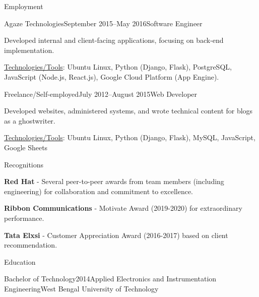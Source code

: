 \documentclass{resume} %
\begin{document}
\begin{rSection}{Employment}

\begin{rSubsection}{Agaze Technologies}{September 2015–May 2016}{Software Engineer}{}
\item Developed internal and client-facing applications, focusing on back-end implementation.
\item \underline{Technologies/Tools}: Ubuntu Linux, Python (Django, Flask), PostgreSQL, JavaScript (Node.js, React.js), Google Cloud Platform (App Engine).
\end{rSubsection}


\begin{rSubsection}{Freelance/Self-employed}{July 2012–August 2015}{Web Developer}{}
\item Developed websites, administered systems, and wrote technical content for blogs as a ghostwriter.
\item \underline{Technologies/Tools}: Ubuntu Linux, Python (Django, Flask), MySQL, JavaScript, Google Sheets
\end{rSubsection}

\end{rSection}


\begin{rSection}{Recognitions}

\item {\bf Red Hat} - Several peer-to-peer awards from team members (including engineering) for collaboration and commitment to excellence.
\item {\bf Ribbon Communications} - Motivate Award (2019-2020) for extraordinary performance.
\item {\bf Tata Elxsi} - Customer Appreciation Award (2016-2017) based on client recommendation.

\end{rSection}


\begin{rSection}{Education}

\begin{rSubsection}{Bachelor of Technology}{2014}{Applied Electronics and Instrumentation Engineering}{West Bengal University of Technology}
\end{rSubsection}

\end{rSection}

\end{document}
